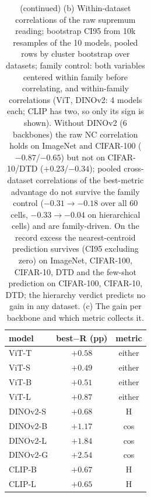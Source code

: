 \begin{table}[H]
\footnotesize
\setlength{\tabcolsep}{5pt}
\begin{tabular}{lcc}
\toprule
model & best$-$R (pp) & metric \\
\midrule
ViT-T & $+0.58$ & either \\
ViT-S & $+0.49$ & either \\
ViT-B & $+0.51$ & either \\
ViT-L & $+0.87$ & either \\
DINOv2-S & $+0.68$ & H \\
DINOv2-B & $+1.17$ & cos \\
DINOv2-L & $+1.84$ & cos \\
DINOv2-G & $+2.54$ & cos \\
CLIP-B & $+0.67$ & H \\
CLIP-L & $+0.65$ & H \\
\bottomrule
\end{tabular}
\par\vspace{5pt}
\endgroup
\caption{(continued) (b) Within-dataset correlations of the raw supremum reading; bootstrap CI95 from 10k resamples of the 10 models, pooled rows by cluster bootstrap over datasets; family control: both variables centered within family before correlating, and within-family correlations (ViT, DINOv2: 4 models each; CLIP has two, so only its sign is shown). Without DINOv2 (6 backbones) the raw NC correlation holds on ImageNet and CIFAR-100 ($-0.87$/$-0.65$) but not on CIFAR-10/DTD ($+0.23$/$-0.34$); pooled cross-dataset correlations of the best-metric advantage do not survive the family control ($-0.31\to-0.18$ over all 60 cells, $-0.33\to-0.04$ on hierarchical cells) and are family-driven. On the record excess the nearest-centroid prediction survives (CI95 excluding zero) on ImageNet, CIFAR-100, CIFAR-10, DTD and the few-shot prediction on CIFAR-100, CIFAR-10, DTD; the hierarchy verdict predicts no gain in any dataset. (c) The gain per backbone and which metric collects it. %
}
\end{table}
